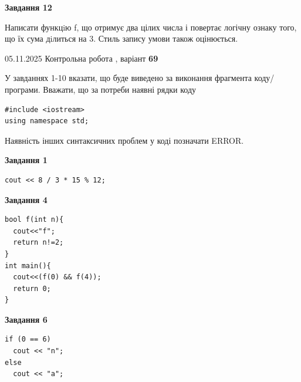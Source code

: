 \documentclass[12pt, ukrainian]{article}
\begin{document}
{\begin {large}
\begin{minipage}[t]{11.0cm}
\begin{center}
\textbf{Завдання 12}
\end{center}

Написати функцiю f, що отримує два цілих числа і повертає логічну ознаку того, що їх сума дiлиться на 3. Стиль запису умови також оцінюється.\par

\end{minipage}

\end {large}}
\newpage

{\Large{05.11.2025 Контрольна робота , варіант  \No \textbf { 69 }\par}}
{
\begin {large}
У завданнях 1-10 вказати, що буде виведено за виконання фрагмента коду/про\-гра\-ми.
Вважати, що за потреби наявні рядки коду
\begin{verbatim}
#include <iostream>
using namespace std;
\end{verbatim}
Наявність інших синтаксичних проблем у коді позначати ERROR.

\begin{minipage}[t]{7.0cm}

\begin{center}
\textbf{Завдання 1}
\end{center}
\vspace{-8mm}

\begin{verbatim}
cout << 8 / 3 * 15 % 12;
\end{verbatim}



\begin{center}
\textbf{Завдання 4}
\end{center}
\vspace{-8mm}

\begin{verbatim}
bool f(int n){
  cout<<"f";
  return n!=2;
}
int main(){
  cout<<(f(0) && f(4));
  return 0;
}
\end{verbatim}



\begin{center}
\textbf{Завдання 6}
\end{center}
\vspace{-8mm}

\begin{verbatim}
if (0 == 6)
  cout << "n";
else
  cout << "a";
\end{verbatim}




\end{minipage}
\end{large}}
\end{document}
